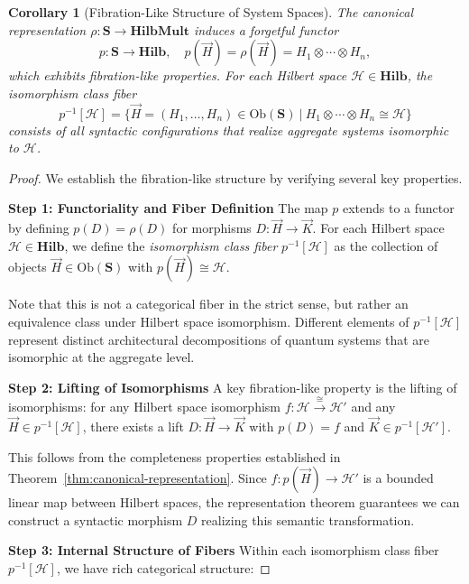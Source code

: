\documentclass[11pt]{article}
\newtheorem{corollary}{Corollary}
\begin{document}
\begin{corollary}[Fibration-Like Structure of System Spaces]\label{cor:fibration}
The canonical representation $\rho: \mathbf{S} \to \mathbf{HilbMult}$ induces a forgetful functor 
\[
p: \mathbf{S} \to \mathbf{Hilb}, \quad p(\vec{H}) = \rho(\vec{H}) = H_1 \otimes \cdots \otimes H_n,
\]
which exhibits fibration-like properties. For each Hilbert space $\mathcal{H} \in \mathbf{Hilb}$, the isomorphism class fiber
\[
p^{-1}[\mathcal{H}] = \bigl\{\vec{H} = (H_1, \dots, H_n) \in \mathrm{Ob}(\mathbf{S}) \ \big|\ H_1 \otimes \cdots \otimes H_n \cong \mathcal{H}\bigr\}
\]
consists of all syntactic configurations that realize aggregate systems isomorphic to $\mathcal{H}$.  
\end{corollary}

\begin{proof}
We establish the fibration-like structure by verifying several key properties.

\noindent\textbf{Step 1: Functoriality and Fiber Definition}
The map $p$ extends to a functor by defining $p(D) = \rho(D)$ for morphisms $D: \vec{H} \to \vec{K}$. For each Hilbert space $\mathcal{H} \in \mathbf{Hilb}$, we define the \emph{isomorphism class fiber} $p^{-1}[\mathcal{H}]$ as the collection of objects $\vec{H} \in \mathrm{Ob}(\mathbf{S})$ with $p(\vec{H}) \cong \mathcal{H}$. 

Note that this is not a categorical fiber in the strict sense, but rather an equivalence class under Hilbert space isomorphism. Different elements of $p^{-1}[\mathcal{H}]$ represent distinct architectural decompositions of quantum systems that are isomorphic at the aggregate level.

\noindent\textbf{Step 2: Lifting of Isomorphisms}
A key fibration-like property is the lifting of isomorphisms: for any Hilbert space isomorphism $f: \mathcal{H} \xrightarrow{\cong} \mathcal{H}'$ and any $\vec{H} \in p^{-1}[\mathcal{H}]$, there exists a lift $D: \vec{H} \to \vec{K}$ with $p(D) = f$ and $\vec{K} \in p^{-1}[\mathcal{H}']$.

This follows from the completeness properties established in Theorem~\ref{thm:canonical-representation}. Since $f: p(\vec{H}) \to \mathcal{H}'$ is a bounded linear map between Hilbert spaces, the representation theorem guarantees we can construct a syntactic morphism $D$ realizing this semantic transformation.

\noindent\textbf{Step 3: Internal Structure of Fibers}
Within each isomorphism class fiber $p^{-1}[\mathcal{H}]$, we have rich categorical structure:


\end{proof}
\end{document}
